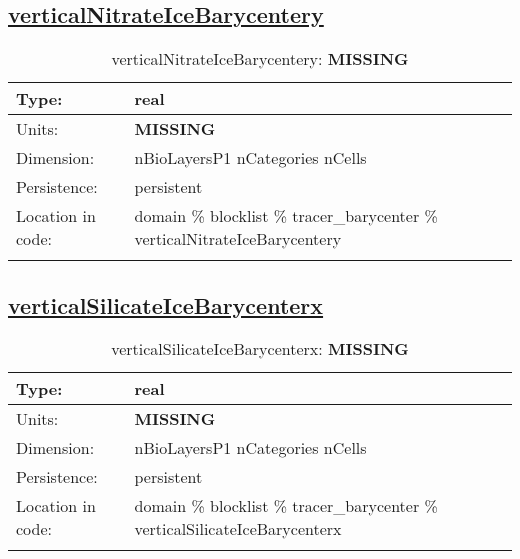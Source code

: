 \subsection[verticalNitrateIceBarycentery]{\hyperref[sec:var_tab_tracer_barycenter]{verticalNitrateIceBarycentery}}
\label{subsec:var_sec_tracer_barycenter_verticalNitrateIceBarycentery}
\begin{center}
\begin{longtable}{| p{2.0in} | p{4.0in} |}
        \hline 
        Type: & real \\
        \hline 
        Units: & {\bf \color{red} MISSING} \\
        \hline 
        Dimension: & nBioLayersP1 nCategories nCells \\
        \hline 
        Persistence: & persistent \\
        \hline 
         Location in code: & domain \% blocklist \% tracer\_barycenter \% verticalNitrateIceBarycentery \\
         \hline 
    \caption{verticalNitrateIceBarycentery: {\bf \color{red} MISSING}}
\end{longtable}
\end{center}
\subsection[verticalSilicateIceBarycenterx]{\hyperref[sec:var_tab_tracer_barycenter]{verticalSilicateIceBarycenterx}}
\label{subsec:var_sec_tracer_barycenter_verticalSilicateIceBarycenterx}
\begin{center}
\begin{longtable}{| p{2.0in} | p{4.0in} |}
        \hline 
        Type: & real \\
        \hline 
        Units: & {\bf \color{red} MISSING} \\
        \hline 
        Dimension: & nBioLayersP1 nCategories nCells \\
        \hline 
        Persistence: & persistent \\
        \hline 
         Location in code: & domain \% blocklist \% tracer\_barycenter \% verticalSilicateIceBarycenterx \\
         \hline 
    \caption{verticalSilicateIceBarycenterx: {\bf \color{red} MISSING}}
\end{longtable}
\end{center}
